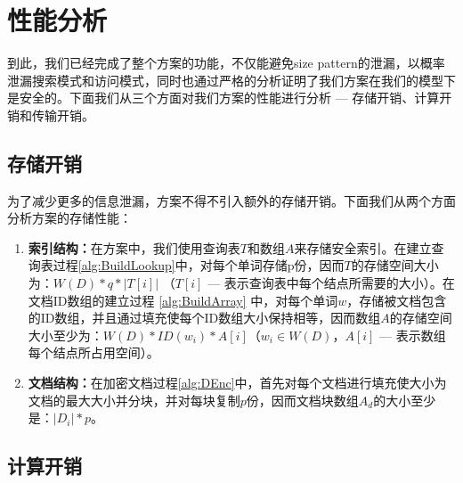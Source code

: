 \section{性能分析}
\label{sec:searchpattern_capability}
到此，我们已经完成了整个方案的功能，不仅能避免size pattern的泄漏，以概率泄漏搜索模式和访问模式，同时也通过严格的分析证明了我们方案在我们的模型下是安全的。下面我们从三个方面对我们方案的性能进行分析 --- 存储开销、计算开销和传输开销。

\subsection{存储开销}
\label{sec:searchpattern_capability_storage}

为了减少更多的信息泄漏，方案不得不引入额外的存储开销。下面我们从两个方面分析方案的存储性能：
\begin{enumerate}
  \item \textbf{索引结构：}在方案中，我们使用查询表$T$和数组$A$来存储安全索引。在建立查询表过程\ref{alg:BuildLookup}中，对每个单词存储p份，因而$T$的存储空间大小为：$W(D) * q * |T[i]|$ （$T[i]$ --- 表示查询表中每个结点所需要的大小）。在文档ID数组的建立过程
      \ref{alg:BuildArray} 中，对每个单词$w$，存储被文档包含的ID数组，并且通过填充使每个ID数组大小保持相等，因而数组$A$的存储空间大小至少为：$W(D) * ID(w_i) * A[i]$（$w_i \in W(D)$，$A[i]$ --- 表示数组每个结点所占用空间）。

  \item \textbf{文档结构：}在加密文档过程\ref{alg:DEnc}中，首先对每个文档进行填充使大小为文档的最大大小并分块，并对每块复制$p$份，因而文档块数组$A_d$的大小至少是：$|D_i| * p$。

\end{enumerate}


\subsection{计算开销}
\label{sec:searchpattern_capability_computing}

